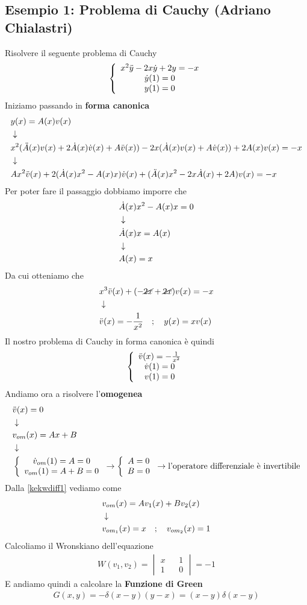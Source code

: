 \subsection{Esempio 1: Problema di Cauchy (Adriano Chialastri) \label{canon}}
Risolvere il seguente problema di Cauchy
\begin{align}
	\left\{ \begin{array}{ccc} x^2 \ddot{y} - 2x \dot{y} + 2y = -x\\ \dot{y}(1)=0\\ y(1)=0 \end{array} \right.
\end{align}
Iniziamo passando in \textbf{forma canonica}
\begin{align}
	&y(x) = A(x)v(x)	\\ &\downarrow \nonumber \\
	&x^2 (\ddot{A}(x)v(x) + 2\dot{A}(x)\dot{v}(x) + A \ddot{v}(x)) - 2x (\dot{A}(x)v(x) + A \dot{v}(x)) + 2A(x)v(x) = -x \nonumber \\ &\downarrow \nonumber \\
	&Ax^2 \ddot{v}(x) + 2(\dot{A}(x) x^2 - A(x)x) \dot{v}(x) + (\ddot{A}(x) x^2 - 2x\dot{A}(x) +2A)v(x) = -x	
\end{align}
Per poter fare il passaggio dobbiamo imporre che
\begin{align}
	&\dot{A}(x) x^2 - A(x)x = 0 \\ &\downarrow \nonumber \\
	&\dot{A}(x) x = A(x) \nonumber \\ &\downarrow \nonumber \\
	&A(x) = x  
\end{align}
Da cui otteniamo che
\begin{align}
	&x^3 \ddot{v}(x) + (-\cancel{2x} +\cancel{2x})v(x) = -x	\\ &\downarrow \nonumber \\
	&\ddot{v}(x) = -\frac{1}{x^2} \quad ; \quad y(x) = x v(x)
\end{align}
Il nostro problema di Cauchy in forma canonica è quindi
\begin{align}
	\left\{ \begin{array}{ccc} \ddot{v}(x) = -\frac{1}{x^2}\\ \dot{v}(1)=0\\ v(1)=0 \end{array} \right.
\end{align}
Andiamo ora a risolvere l'\textbf{omogenea}
\begin{align}
	&\ddot{v}(x) = 0 \\ &\downarrow \nonumber \\
	&v_{om}(x) = Ax + B  \label{kekwdiff1}\\ &\downarrow \nonumber \\
	&\left\{ \begin{array}{cc} \dot{v}_{om}(1)=A=0\\ v_{om}(1)=A+B=0 \end{array} \right. \to \left\{ \begin{array}{cc} A=0\\ B=0 \end{array} \right. \to \text{l'operatore differenziale è invertibile} 
\end{align}
Dalla \ref{kekwdiff1} vediamo come
\begin{align}
	&v_{om}(x) = A v_1(x) + B v_2(x) \nonumber \\ &\downarrow \nonumber \\
	&v_{om_1}(x) = x \quad ; \quad v_{om_2}(x) = 1
\end{align}
Calcoliamo il Wronskiano dell'equazione
\begin{align}
	W(v_1,v_2) = \begin{vmatrix}
		x && 1 \\
		1 && 0
	\end{vmatrix} = -1
\end{align}
E andiamo quindi a calcolare la \textbf{Funzione di Green}
\begin{align}
	G(x,y) = - \delta (x-y) (y-x) = (x-y) \delta(x-y)
\end{align}
